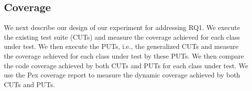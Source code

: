 \subsection{Coverage}

We next describe our design of our experiment for addressing RQ1. We execute the existing test suite (CUTs) and measure the coverage achieved for each class under test. We then execute the PUTs, i.e., the generalized CUTs and measure the coverage achieved for each class under test by these PUTs. We then compare the code coverage achieved by both CUTs and PUTs for each class under test. We use the Pex coverage report to measure the dynamic coverage achieved by both CUTs and PUTs. 

